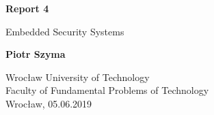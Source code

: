 \begin{titlepage}
  \begin{center}
      \vspace*{1cm}

      \textbf{Report 4}

      \vspace{0.5cm}
       Embedded Security Systems

      \vspace{1.5cm}

      \textbf{Piotr Szyma}

      \vfill

      \vspace{0.8cm}

      Wrocław University of Technology\\
      Faculty of Fundamental Problems of Technology\\
      Wrocław, 05.06.2019

  \end{center}
\end{titlepage}